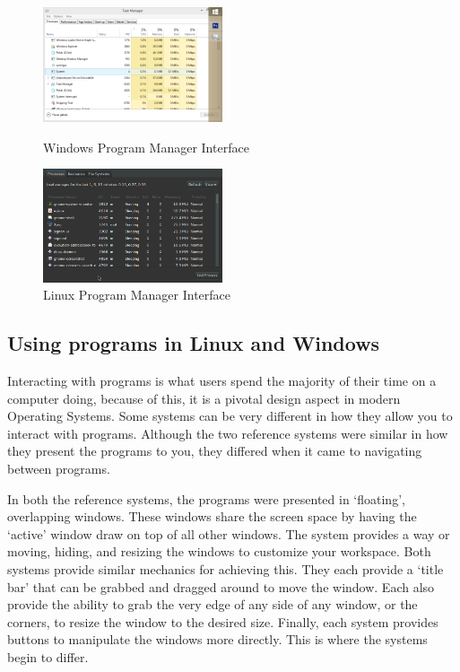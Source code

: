\documentclass[a4paper]{report}
\begin{document}
\begin{figure}[ht]
\centering
\begin{minipage}{.5\textwidth}
  \centering
  \includegraphics[width=200px]{images/Windows_Program_Manager_Screenshot}
  \caption{Windows Program Manager Interface}
  \label{fig:WinProcManScreen}
\end{minipage}%
\begin{minipage}{.5\textwidth}
  \centering
  \includegraphics[width=200px]{images/Linux_Program_Manager_Screenshot}
  \caption{Linux Program Manager Interface}
  \label{fig:LinProcManScreen}
\end{minipage}
\end{figure}


\subsection{Using programs in Linux and Windows}

Interacting with programs is what users spend the majority of their time on a computer doing, because of this, it is a pivotal design aspect in modern Operating Systems. Some systems can be very different in how they allow you to interact with programs. Although the two reference systems were similar in how they present the programs to you, they differed when it came to navigating between programs.

In both the reference systems, the programs were presented in `floating', overlapping windows. These windows share the screen space by having the `active' window draw on top of all other windows. The system provides a way or moving, hiding, and resizing the windows to customize your workspace. Both systems provide similar mechanics for achieving this. They each provide a `title bar' that can be grabbed and dragged around to move the window. Each also provide the ability to grab the very edge of any side of any window, or the corners, to resize the window to the desired size. Finally, each system provides buttons to manipulate the windows more directly. This is where the systems begin to differ.
\end{document}
